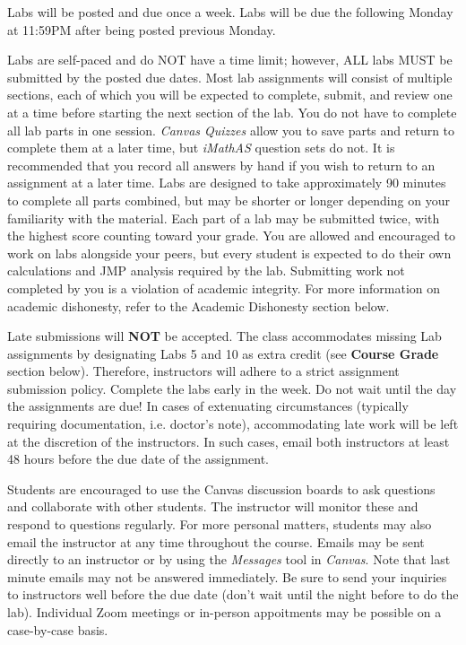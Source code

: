 \documentclass[11pt]{article}
\begin{document}
Labs will be posted and due once a week. Labs will be  due the following
Monday at 11:59PM after being posted previous Monday. 

Labs are self-paced and do NOT have a time limit; however, ALL labs
MUST be submitted by the posted due dates. Most lab assignments will consist of
multiple sections, each of which you will be expected to complete, submit,
and review one at a time before starting the next section of the lab. 
You do not have to complete all lab
parts in one session. {\em Canvas Quizzes} allow you to save parts and return
to complete them at a later time, but {\em iMathAS} question sets do not. It is 
recommended that you record all answers by hand if you wish to return to an 
assignment at a later time. Labs are designed to take approximately 90 minutes to complete all parts combined,
but may be shorter or longer depending on your familiarity with the material.
Each part of a lab may be submitted twice, with the highest score
counting toward your grade. You are allowed and encouraged to work on labs
alongside your peers, but every student is expected to do their own
calculations and JMP analysis required by the lab. Submitting work not
completed by you is a violation of academic integrity. For more information on academic dishonesty, 
refer to the Academic Dishonesty section below.
\vspace{0.2in}

 Late submissions will {\bf NOT} be accepted. The
class accommodates missing Lab assignments by designating Labs 5 and 10 as
extra credit (see {\bf Course Grade} section below). Therefore, instructors
will adhere to a strict assignment submission policy. Complete the labs early
in the week. Do not wait until the day the assignments are due! In cases of
extenuating circumstances (typically requiring documentation, i.e. doctor's note), accommodating late work will be left at the
discretion of the instructors. In such cases, email both instructors at least
48 hours before the due date of the assignment.
\vspace{0.2in}
 
 Students are encouraged to use the Canvas discussion boards to ask questions and 
collaborate with other students. The instructor will monitor these and respond to questions regularly. 
For more personal matters, students may also email the instructor at any time throughout the course. 
Emails may be sent directly to an instructor or by using the {\em Messages} tool in {\em Canvas}. 
Note that last minute emails may not be answered
immediately. Be sure to send your inquiries to instructors well before the
due date (don't wait until the night before to do the lab). 
Individual Zoom meetings or in-person appoitments may be possible on a case-by-case basis.
\vspace{0.2in}
\end{document}
